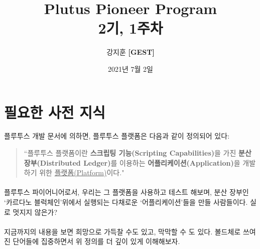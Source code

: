 \documentclass[a4paper, 11pt]{article}
\title{Plutus Pioneer Program \\ \large 2기, 1주차}
\author{강지훈 \textbf{[GEST]}}
\date{2021년 7월 2일}
\begin{document}
    \maketitle

    \section{필요한 사전 지식}
    
    플루투스 개발 문서에 의하면, 플루투스 플랫폼은 다음과 같이 정의되어 있다:

    \begin{quotation}
        ``플루투스 플랫폼이란 \textbf{스크립팅 기능(Scripting Capabilities)}을 가진 \textbf{분산 장부(Distributed Ledger)}를 이용하는 \textbf{어플리케이션(Application)}을 개발하기 위한 \underline{플랫폼(Platform)}이다."
    \end{quotation}

    \paragraph{}플루투스 파이어니어로서, 우리는 그 플랫폼을 사용하고 테스트 해보며, 분산 장부인 `카르다노 블럭체인'위에서 실행되는 다채로운 `어플리케이션'들을 만들 사람들이다. 실로 멋지지 않은가?
    
    \paragraph{} 지금까지의 내용을 보면 희망으로 가득찰 수도 있고, 막막할 수 도 있다. 볼드체로 쓰여진 단어들에 집중하면서 위 정의를 더 깊이 있게 이해해보자.
\end{document}
